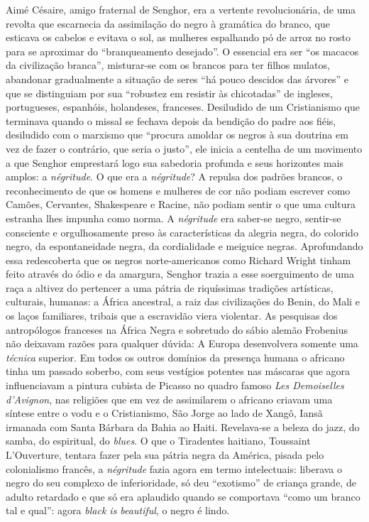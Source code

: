\documentclass[
  letterpaper,
  DIV=11,
  numbers=noendperiod]{scrreprt}
\begin{document}
Aimé Césaire, amigo fraternal de Senghor, era a vertente revolucionária,
de uma revolta que escarnecia da assimilação do negro à gramática do
branco, que esticava os cabelos e evitava o sol, as mulheres espalhando
pó de arroz no rosto para se aproximar do ``branqueamento desejado''. O
essencial era ser ``os macacos da civilização branca'', misturar-se com
os brancos para ter filhos mulatos, abandonar gradualmente a situação de
seres ``há pouco descidos das árvores'' e que se distinguiam por sua
``robustez em resistir às chicotadas'' de ingleses, portugueses,
espanhóis, holandeses, franceses. Desiludido de um Cristianismo que
terminava quando o missal se fechava depois da bendição do padre aos
fiéis, desiludido com o marxismo que ``procura amoldar os negros à sua
doutrina em vez de fazer o contrário, que seria o justo'', ele inicia a
centelha de um movimento a que Senghor emprestará logo sua sabedoria
profunda e seus horizontes mais amplos: a \emph{négritude}. O que era a
\emph{négritude}? A repulsa dos padrões brancos, o reconhecimento de que
os homens e mulheres de cor não podiam escrever como Camões, Cervantes,
Shakespeare e Racine, não podiam sentir o que uma cultura estranha lhes
impunha como norma. A \emph{négritude} era saber-se negro, sentir-se
consciente e orgulhosamente preso às características da alegria negra,
do colorido negro, da espontaneidade negra, da cordialidade e meiguice
negras. Aprofundando essa redescoberta que os negros norte-americanos
como Richard Wright tinham feito através do ódio e da amargura, Senghor
trazia a esse soerguimento de uma raça a altivez do pertencer a uma
pátria de riquíssimas tradições artísticas, culturais, humanas: a África
ancestral, a raiz das civilizações do Benin, do Mali e os laços
familiares, tribais que a escravidão viera violentar. As pesquisas dos
antropólogos franceses na África Negra e sobretudo do sábio alemão
Frobenius não deixavam razões para qualquer dúvida: A Europa
desenvolvera somente uma \emph{técnica} superior. Em todos os outros
domínios da presença humana o africano tinha um passado soberbo, com
seus vestígios potentes nas máscaras que agora influenciavam a pintura
cubista de Picasso no quadro famoso \emph{Les Demoiselles d'Avignon},
nas religiões que em vez de assimilarem o africano criavam uma síntese
entre o vodu e o Cristianismo, São Jorge ao lado de Xangô, Iansã
irmanada com Santa Bárbara da Bahia ao Haiti. Revelava-se a beleza do
jazz, do samba, do espiritual, do \emph{blues}. O que o Tiradentes
haitiano, Toussaint L'Ouverture, tentara fazer pela sua pátria negra da
América, pisada pelo colonialismo francês, a \emph{négritude} fazia
agora em termo intelectuais: liberava o negro do seu complexo de
inferioridade, só deu ``exotismo'' de criança grande, de adulto
retardado e que só era aplaudido quando se comportava ``como um branco
tal e qual'': agora \emph{black is beautiful}, o negro é lindo.
\end{document}
